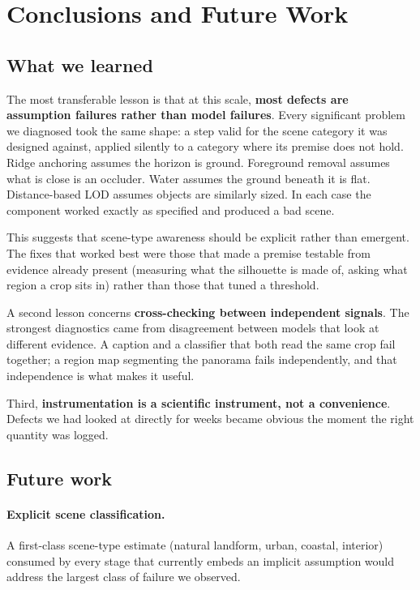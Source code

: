 \section{Conclusions and Future Work}
\label{sec:conclusions}

\subsection{What we learned}

The most transferable lesson is that at this scale, \textbf{most defects are
assumption failures rather than model failures}. Every significant problem we
diagnosed took the same shape: a step valid for the scene category it was designed
against, applied silently to a category where its premise does not hold. Ridge
anchoring assumes the horizon is ground. Foreground removal assumes what is close
is an occluder. Water assumes the ground beneath it is flat. Distance-based LOD
assumes objects are similarly sized. In each case the component worked exactly as
specified and produced a bad scene.

This suggests that scene-type awareness should be explicit rather than emergent.
The fixes that worked best were those that made a premise testable from evidence
already present (measuring what the silhouette is made of, asking what region a
crop sits in) rather than those that tuned a threshold.

A second lesson concerns \textbf{cross-checking between independent signals}. The
strongest diagnostics came from disagreement between models that look at different
evidence. A caption and a classifier that both read the same crop fail together; a
region map segmenting the panorama fails independently, and that independence is
what makes it useful.

Third, \textbf{instrumentation is a scientific instrument, not a convenience}.
Defects we had looked at directly for weeks became obvious the moment the right
quantity was logged.

\subsection{Future work}

\paragraph{Explicit scene classification.} A first-class scene-type estimate
(natural landform, urban, coastal, interior) consumed by every stage that
currently embeds an implicit assumption would address the largest class of failure
we observed.

